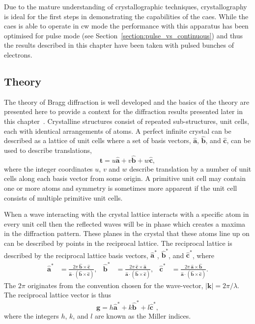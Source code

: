 Due to the mature understanding of crystallographic techniques, crystallography is ideal for the first steps in demonstrating the capabilities of the \gls{caes}.
While the \gls{caes} is able to operate in \gls{cw} mode the performance with this apparatus has been optimised for pulse mode (see Section~\ref{section:pulse_vs_continuous}) and thus the results described in this chapter have been taken with pulsed bunches of electrons.

\subsection{Theory}

The theory of Bragg diffraction is well developed and the basics of the theory are presented here to provide a context for the diffraction results presented later in this chapter~\cite{kittel_introduction_2004}.
Crystalline structures consist of repeated sub-structures, unit cells, each with identical arrangements of atoms.
A perfect infinite crystal can be described as a lattice of unit cells where a set of basis vectors, $\mathbf{\hat{a}}$, $\mathbf{\hat{b}}$, and $\mathbf{\hat{c}}$, can be used to describe translations,
\begin{equation}
\mathbf{t} = u\mathbf{\hat{a}} + v\mathbf{\hat{b}} + w\mathbf{\hat{c}},
\end{equation}
where the integer coordinates $u$, $v$ and $w$ describe translation by a number of unit cells along each basis vector from some origin.
A primitive unit cell may contain one or more atoms and symmetry is sometimes more apparent if the unit cell consists of multiple primitive unit cells.

When a wave interacting with the crystal lattice interacts with a specific atom in every unit cell then the reflected waves will be in phase which creates a maxima in the diffraction pattern.
These planes in the crystal that these atoms line up on can be described by points in the reciprocal lattice.
The reciprocal lattice is described by the reciprocal lattice basis vectors, $\mathbf{\hat{a}^*}$, $\mathbf{\hat{b}^*}$, and $\mathbf{\hat{c}^*}$, where
\begin{align}
\mathbf{\hat{a}^*}&=\frac{2\pi\:\mathbf{\hat{b}}\times\mathbf{\hat{c}}}{\mathbf{\hat{a}}\cdot (\mathbf{\hat{b}} \times \mathbf{\hat{c}})},  &  \mathbf{\hat{b}^*}&=\frac{2\pi\:\mathbf{\hat{c}}\times\mathbf{\hat{a}}}{\mathbf{\hat{a}}\cdot (\mathbf{\hat{b}} \times \mathbf{\hat{c}})},  &  \mathbf{\hat{c}^*}&=\frac{2\pi\:\mathbf{\hat{a}}\times\mathbf{\hat{b}}}{\mathbf{\hat{a}}\cdot (\mathbf{\hat{b}} \times \mathbf{\hat{c}})}.
\end{align}
The $2\pi$ originates from the convention chosen for the wave-vector, $|\mathbf{k}|=2\pi/\lambda$. The reciprocal lattice vector is thus
\begin{equation}
\mathbf{g} = h\mathbf{\hat{a}^*} + k\mathbf{\hat{b}^*} + l\mathbf{\hat{c}^*},
\end{equation}
where the integers $h$, $k$, and $l$ are known as the Miller indices.

